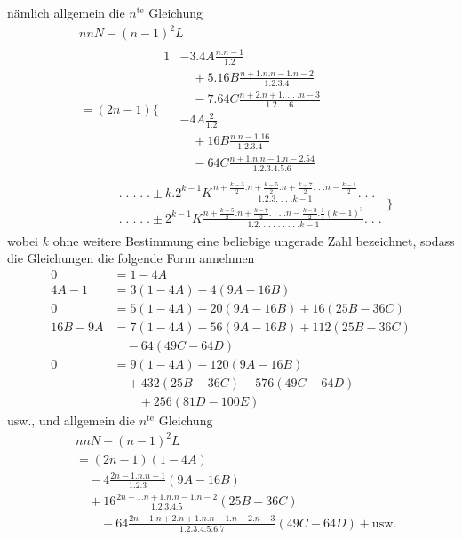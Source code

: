 nämlich allgemein die \(n^{\mathrm{te}}\) Gleichung
\[
\begin{aligned}
&nnN-(n-1)^2L\\[6pt]
&=(2n-1)\Biggl\{\begin{aligned}
1&-3.4A\frac{n. n-1}{1.2}
\\&\quad+5.16B\frac{n+1. n. n-1. n-2}{1.2.3.4}
\\&\quad-7.64C\frac{n+2. n+1.\;.\;.\;. n-3}{1.2.\;.\;.6}\\[6pt]
&-4A\frac{2}{1.2}
\\&\quad+16B\frac{n. n-1.16}{1.2.3.4}
\\&\quad-64C\frac{n+1. n. n-1. n-2.54}{1.2.3.4.5.6}
\end{aligned}\\[6pt]
&\qquad\begin{aligned}
&.\;.\;.\;.\;.\pm k.2^{k-1}K
\frac{n+\frac{k-3}{2}. n+\frac{k-5}{2}. n+\frac{k-7}{2}.\;.\;. n-\frac{k-1}{2}}
{1.2.3.\;.\;.\;. k-1}.\;.\;.\\[6pt]
&.\;.\;.\;.\;.\pm 2^{k-1}K
\frac{n+\frac{k-5}{2}. n+\frac{k-7}{2}.\;.\;.\;. n-\frac{k-3}{2}.\frac14(k-1)^3}
{1.2.\;.\;.\;.\;.\;.\;.\;.\;. k-1}.\;.\;.
\end{aligned}\Biggr\}
\end{aligned}
\]
wobei \(k\) ohne weitere Bestimmung eine beliebige ungerade Zahl bezeichnet, sodass die Gleichungen die folgende Form annehmen
\[
\begin{aligned}
0&=1-4A\\[6pt]
4A-1&=3(1-4A)-4(9A-16B)\\[6pt]
0&=5(1-4A)-20(9A-16B)+16(25B-36C)\\[6pt]
16B-9A&=7(1-4A)-56(9A-16B)+112(25B-36C)\\&\quad-64(49C-64D)\\[6pt]
0&=9(1-4A)-120(9A-16B)\\&\quad+432(25B-36C)-576(49C-64D)\\[6pt]
&\qquad+256(81D-100E)
\end{aligned}
\]
usw., und allgemein die \(n^{\mathrm{te}}\) Gleichung
\[
\begin{aligned}
&nnN-(n-1)^2L\\[6pt]
&=(2n-1)(1-4A)\\&\quad-4\frac{2n-1. n. n-1}{1.2.3}(9A-16B)\\&\quad+16\frac{2n-1. n+1. n. n-1. n-2}{1.2.3.4.5}(25B-36C)\\[6pt]
&\qquad-64\frac{2n-1. n+2. n+1. n. n-1. n-2. n-3}{1.2.3.4.5.6.7}(49C-64D)+\text{usw.}
\end{aligned}
\]
